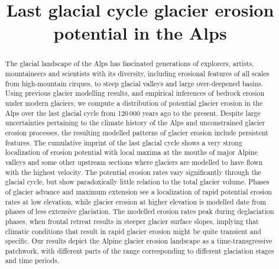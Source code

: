 \documentclass[esurf, manuscript]{copernicus}
\title{Last glacial cycle glacier erosion potential in the Alps}
\affil[1]{Independent scholar, Anafi, Greece}
\affil[2]{Institute of Earth Surface Dynamics, University of Lausanne, Switzerland}
\begin{document}

\maketitle

\begin{abstract}

    The glacial landscape of the Alps has fascinated generations of explorers,
    artists, mountaineers and scientists with its diversity, including
    erosional features of all scales from high-mountain cirques, to steep
    glacial valleys and large over-deepened basins. Using previous glacier
    modelling results, and empirical inferences of bedrock erosion under modern
    glaciers, we compute a distribution of potential glacier erosion in the
    Alps over the last glacial cycle from 120\,000 years ago to the present.
    Despite large uncertainties pertaining to the climate history of the Alps
    and unconstrained glacier erosion processes, the resulting modelled
    patterns of glacier erosion include persistent features. The cumulative
    imprint of the last glacial cycle shows a very strong localization of
    erosion potential with local maxima at the mouths of major Alpine valleys
    and some other upstream sections where glaciers are modelled to have flown
    with the highest velocity. The potential erosion rates vary significantly
    through the glacial cycle, but show paradoxically little relation to the
    total glacier volume. Phases of glacier advance and maximum extension see a
    localization of rapid potential erosion rates at low elevation, while
    glacier erosion at higher elevation is modelled date from phases of less
    extensive glaciation. The modelled erosion rates peak during deglaciation
    phases, when frontal retreat results in steeper glacier surface slopes,
    implying that climatic conditions that result in rapid glacier erosion
    might be quite transient and specific.
    Our results depict the Alpine glacier erosion landscape as a
    time-transgressive patchwork, with different parts of the range
    corresponding to different glaciation stages and time periods.

\end{abstract}


\introduction
\end{document}
